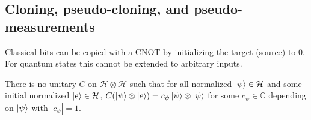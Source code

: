 \subsection{Cloning, pseudo-cloning, and pseudo-measurements}

Classical bits can be copied with a CNOT by initializing the target (source) to \(0\).
For quantum states this cannot be extended to arbitrary inputs.

\begin{theorem}[No-cloning]\label{thm:no-cloning}
There is no unitary $C$ on $\mathcal{H}\otimes\mathcal{H}$ such that for all normalized $\ket{\psi}\in\mathcal{H}$ and some initial normalized $\ket{e}\in\mathcal{H}$,
\(
C(\ket{\psi}\otimes\ket{e})=c_\psi\ket{\psi}\otimes\ket{\psi}
\)
for some $c_\psi\in\mathbb{C}$ depending on $\ket{\psi}$ with $|c_\psi|=1$.
\end{theorem}

